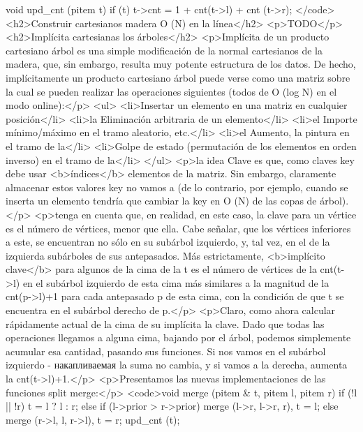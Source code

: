 void upd_cnt (pitem t) {
if (t)
t->cnt = 1 + cnt(t->l) + cnt (t->r);
}</code>
<h2>Construir cartesianos madera O (N) en la línea</h2>
<p>TODO</p>
<h2>Implícita cartesianas los árboles</h2>
<p>Implícita de un producto cartesiano árbol es una simple modificación de la normal cartesianos de la madera, que, sin embargo, resulta muy potente estructura de los datos. De hecho, implícitamente un producto cartesiano árbol puede verse como una matriz sobre la cual se pueden realizar las operaciones siguientes (todos de O (log N) en el modo online):</p>
<ul>
<li>Insertar un elemento en una matriz en cualquier posición</li>
<li>la Eliminación arbitraria de un elemento</li>
<li>el Importe mínimo/máximo en el tramo aleatorio, etc.</li>
<li>el Aumento, la pintura en el tramo de la</li>
<li>Golpe de estado (permutación de los elementos en orden inverso) en el tramo de la</li>
</ul>
<p>la idea Clave es que, como claves key debe usar <b>índices</b> elementos de la matriz. Sin embargo, claramente almacenar estos valores key no vamos a (de lo contrario, por ejemplo, cuando se inserta un elemento tendría que cambiar la key en O (N) de las copas de árbol).</p>
<p>tenga en cuenta que, en realidad, en este caso, la clave para un vértice es el número de vértices, menor que ella. Cabe señalar, que los vértices inferiores a este, se encuentran no sólo en su subárbol izquierdo, y, tal vez, en el de la izquierda subárboles de sus antepasados. Más estrictamente, <b>implícito clave</b> para algunos de la cima de la t es el número de vértices de la cnt(t->l) en el subárbol izquierdo de esta cima más similares a la magnitud de la cnt(p->l)+1 para cada antepasado p de esta cima, con la condición de que t se encuentra en el subárbol derecho de p.</p>
<p>Claro, como ahora calcular rápidamente actual de la cima de su implícita la clave. Dado que todas las operaciones llegamos a alguna cima, bajando por el árbol, podemos simplemente acumular esa cantidad, pasando sus funciones. Si nos vamos en el subárbol izquierdo - накапливаемая la suma no cambia, y si vamos a la derecha, aumenta la cnt(t->l)+1.</p>
<p>Presentamos las nuevas implementaciones de las funciones split merge:</p>
<code>void merge (pitem & t, pitem l, pitem r) {
if (!l || !r)
t = l ? l : r;
else if (l->prior > r->prior)
merge (l->r, l->r, r), t = l;
else
merge (r->l, l, r->l), t = r;
upd_cnt (t);
}

